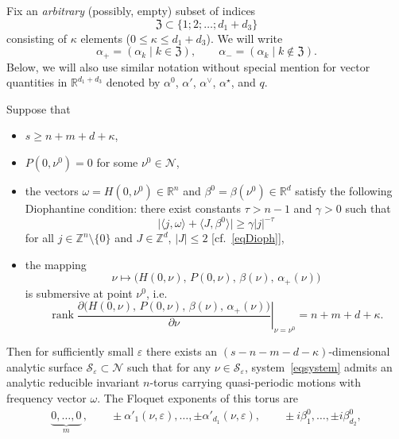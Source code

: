 \documentclass[12pt,reqno]{amsart}
\theoremstyle{definition}
\begin{document}
Fix an \emph{arbitrary} (possibly, empty) subset of indices
\[
{\mathfrak Z}\subset\{1;2;\ldots;d_1+d_3\}
\]
consisting of $\kappa$ elements ($0{\leqslant}\kappa{\leqslant} d_1+d_3$). We will write
\[
\alpha_+=(\alpha_k \mid k\in{\mathfrak Z}), \qquad \alpha_-=(\alpha_k \mid k\notin{\mathfrak Z}).
\]
Below, we will also use similar notation without special mention for vector
quantities in ${\mathbb R}^{d_1+d_3}$ denoted by $\alpha^0$, $\alpha'$, $\alpha^\vee$,
$\alpha^\star$, and $q$.

\begin{thm}\label{thC2}
Suppose that
\begin{itemize}
\item $s{\geqslant} n+m+d+\kappa$,
\item $P(0,\nu^0)=0$ for some $\nu^0\in{\mathcal N}$,
\item the vectors $\omega=H(0,\nu^0)\in{\mathbb R}^n$ and
$\beta^0=\beta(\nu^0)\in{\mathbb R}^d$ satisfy the following Diophantine condition:
there exist constants $\tau>n-1$ and $\gamma>0$ such that
\begin{equation}
\bigl| \langle j,\omega\rangle+\langle J,\beta^0\rangle \bigr| {\geqslant}
\gamma|j|^{-\tau}
\label{eqnewDioph}
\end{equation}
for all $j\in{\mathbb Z}^n\setminus\{0\}$ and $J\in{\mathbb Z}^d$, $|J|{\leqslant} 2$
\textup{[}cf.~\eqref{eqDioph}\textup{]},
\item the mapping
\[
\nu\mapsto\bigl( H(0,\nu), \, P(0,\nu), \, \beta(\nu), \, \alpha_+(\nu) \bigr)
\]
is submersive at point $\nu^0$, i.e.
\begin{equation}
\left. \operatorname{rank}\frac{
\partial\bigl( H(0,\nu), \, P(0,\nu), \, \beta(\nu), \, \alpha_+(\nu) \bigr)
}{\partial\nu} \right|_{\nu=\nu^0} = n+m+d+\kappa.
\label{eqrank}
\end{equation}
\end{itemize}
Then for sufficiently small ${\varepsilon}$ there exists an
$(s-n-m-d-\kappa)$-dimensional analytic surface ${\mathcal S}_{\varepsilon}\subset{\mathcal N}$ such
that for any $\nu\in{\mathcal S}_{\varepsilon}$, system~\eqref{eqsystem} admits an analytic
reducible invariant $n$-torus carrying quasi-periodic motions with frequency
vector $\omega$. The Floquet exponents of this torus are
\begin{equation}
\begin{gathered}
\underbrace{0,\ldots,0}_m\,, \qquad
\pm\alpha'_1(\nu,{\varepsilon}),\ldots,\pm\alpha'_{d_1}(\nu,{\varepsilon}), \qquad
\pm i\beta^0_1,\ldots,\pm i\beta^0_{d_2}, \\

\end{gathered}
\end{equation}
\end{thm}
\end{document}
